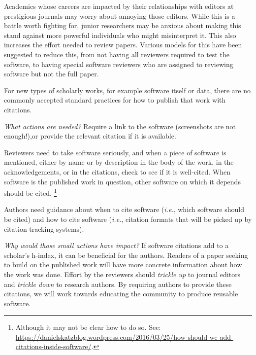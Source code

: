 \documentclass[a4paper,UKenglish]{dagman}
\newcommand{\ie}{\emph{i.e.},\xspace}
\begin{document}
Academics whose careers are impacted by their relationships with editors at prestigious journals may worry about annoying those editors. While this is a battle worth fighting for, junior researchers may be anxious about making this stand against more powerful individuals who might misinterpret it.
This also increases the effort needed to review papers.  Various models for this have been suggested to reduce this, from not having all reviewers required to test the software, to having special software reviewers who are assigned to reviewing software but not the full paper.


For new types of scholarly works, for example software itself or data, there are no commonly accepted standard practices for how to publish that work with citations.

\emph{What actions are needed?}
Require a link to the software (screenshots are not enough!),or provide the relevant citation if it is available.
%

Reviewers need to take software seriously, and when a piece of software is mentioned, either by name or by description in the body of the work, in the acknowledgements, or in the citations, check to see if it is well-cited.  When software is the published work in question, other software on which it depends should be cited.%
\footnote{Although it may not be clear how to do so. See:\\ \url{https://danielskatzblog.wordpress.com/2016/03/25/how-should-we-add-citations-inside-software/}.}

Authors need guidance about when to cite software (\ie which software should be cited) and how to cite software (\ie citation formats that will be picked up by citation tracking systems).

\emph{Why would those small actions have impact?}
If software citations add to a scholar's h-index, it can be beneficial for the authors. Readers of a paper seeking to build on the published work will have more concrete information about how the work was done.
Effort by the reviewers should \emph{trickle up} to journal editors and \emph{trickle down} to research authors.
By requiring authors to provide these citations, we will work towards educating the community to produce reusable software.
\end{document}
